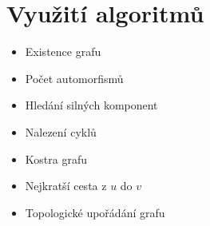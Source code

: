 \section{Využití algoritmů}
  \begin{itemize}
    \item Existence grafu
    \item Počet automorfismů
    \item Hledání silných komponent
    \item Nalezení cyklů
    \item Kostra grafu
    \item Nejkratší cesta z $u$ do $v$
    \item Topologické upořádání grafu
  \end{itemize}
